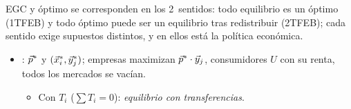 \documentclass{article}
\begin{document}
\begin{columnas}
\begin{ideaclave}
EGC y óptimo se corresponden en los 2~sentidos: todo equilibrio es un óptimo (1TFEB) y todo óptimo puede ser un equilibrio tras redistribuir (2TFEB); cada sentido exige supuestos distintos, y en ellos está la política económica.
\end{ideaclave}
\begin{itemize}
\item {} : $\vec{p}^*$ y $(\vec{x}^*_i,\vec{y}^*_j)$; empresas maximizan $\vec{p}^*\cdot\vec{y}_j$, consumidores $U$ con su renta, todos los mercados se vacían.
  \begin{itemize}
  \item Con  $T_i$ ($\sum T_i=0$): \emph{equilibrio con transferencias}.
  \end{itemize}
\end{itemize}


\end{columnas}
\end{document}
